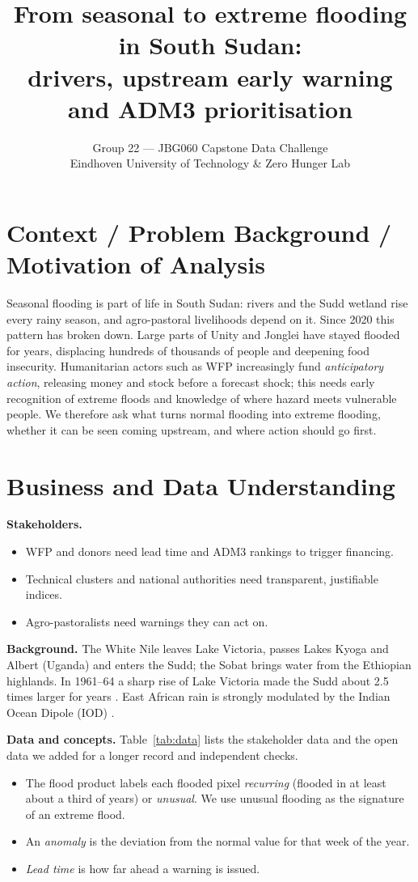 \documentclass[11pt,a4paper]{article}
\title{From seasonal to extreme flooding in South Sudan:\\drivers, upstream early warning and ADM3 prioritisation}
\author{Group 22 --- JBG060 Capstone Data Challenge\\Eindhoven University of Technology \& Zero Hunger Lab}
\date{}
\begin{document}
\maketitle

\section{Context / Problem Background / Motivation of Analysis}
Seasonal flooding is part of life in South Sudan: rivers and the Sudd wetland rise every rainy season, and
agro-pastoral livelihoods depend on it. Since 2020 this pattern has broken down. Large parts of Unity and Jonglei have
stayed flooded for years, displacing hundreds of thousands of people and deepening food insecurity.
Humanitarian actors such as WFP increasingly fund \emph{anticipatory action}, releasing money and stock before a
forecast shock; this needs early recognition of extreme floods and knowledge of where hazard meets vulnerable
people. We therefore ask what turns normal flooding into extreme flooding, whether it can be seen coming
upstream, and where action should go first.

\section{Business and Data Understanding}
\textbf{Stakeholders.}
\begin{itemize}\setlength\itemsep{0pt}
\item WFP and donors need lead time and ADM3 rankings to trigger financing.
\item Technical clusters and national authorities need transparent, justifiable indices.
\item Agro-pastoralists need warnings they can act on.
\end{itemize}

\textbf{Background.} The White Nile leaves Lake Victoria, passes Lakes Kyoga and Albert (Uganda) and enters the Sudd;
the Sobat brings water from the Ethiopian highlands. In 1961--64 a sharp rise of Lake Victoria made the Sudd about 2.5
times larger for years \cite{sutcliffe2018,sutcliffe1999}. East African rain is strongly modulated by the Indian
Ocean Dipole (IOD) \cite{saji1999}.

\textbf{Data and concepts.} Table~\ref{tab:data} lists the stakeholder data and the open data we added for a longer record and independent checks.
\begin{itemize}\setlength\itemsep{0pt}
\item The flood product labels each flooded pixel \emph{recurring} (flooded in at least about a third of years) or
\emph{unusual}. We use unusual flooding as the signature of an extreme flood.
\item An \emph{anomaly} is the deviation from the normal value for that week of the year.
\item \emph{Lead time} is how far ahead a warning is issued.
\end{itemize}
\end{document}
